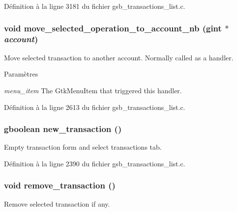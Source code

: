 Définition à la ligne 3181 du fichier gsb\_\-transactions\_\-list.c.

\subsubsection[{move\_\-selected\_\-operation\_\-to\_\-account\_\-nb}]{\setlength{\rightskip}{0pt plus 5cm}void move\_\-selected\_\-operation\_\-to\_\-account\_\-nb (gint $\ast$ {\em account})}\label{gsb__transactions__list_8c_a28b9f175715bce0ac88b473e29ac2fea}
Move selected transaction to another account. Normally called as a handler.


\begin{DoxyParams}{Paramètres}
\item[{\em menu\_\-item}]The GtkMenuItem that triggered this handler. \end{DoxyParams}


Définition à la ligne 2613 du fichier gsb\_\-transactions\_\-list.c.

\subsubsection[{new\_\-transaction}]{\setlength{\rightskip}{0pt plus 5cm}gboolean new\_\-transaction ()}\label{gsb__transactions__list_8c_a2f2bb8bf01af048e33c47d43c8370a21}
Empty transaction form and select transactions tab. 

Définition à la ligne 2390 du fichier gsb\_\-transactions\_\-list.c.

\subsubsection[{remove\_\-transaction}]{\setlength{\rightskip}{0pt plus 5cm}void remove\_\-transaction ()}\label{gsb__transactions__list_8c_aa52082e3faa52c7be3aa7d5dd41d0731}
Remove selected transaction if any. 

